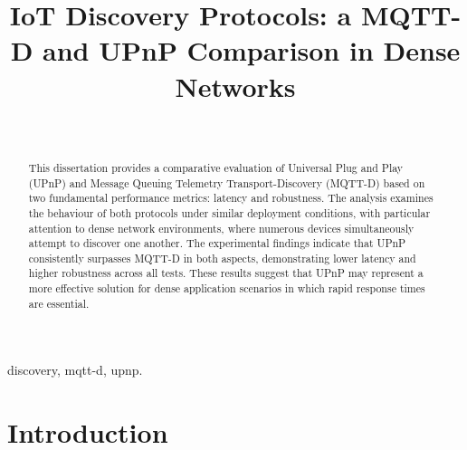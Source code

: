 \documentclass[lettersize,journal]{IEEEtran}
\begin{document}
\title{IoT Discovery Protocols: a MQTT-D and UPnP Comparison in Dense Networks}

\author{ \\
}


\maketitle

\begin{abstract}
This dissertation provides a comparative evaluation of Universal Plug and Play (UPnP) and Message Queuing Telemetry Transport-Discovery (MQTT-D) based on two fundamental performance metrics: latency and robustness. The analysis examines the behaviour of both protocols under similar deployment conditions, with particular attention to dense network environments, where numerous devices simultaneously attempt to discover one another. The experimental findings indicate that UPnP consistently surpasses MQTT-D in both aspects, demonstrating lower latency and higher robustness across all tests. These results suggest that UPnP may represent a more effective solution for dense application scenarios in which rapid response times are essential.
\end{abstract}

\begin{IEEEkeywords}
discovery, mqtt-d, upnp.
\end{IEEEkeywords}

\section{Introduction}
\label{sec_introduction}
\end{document}
